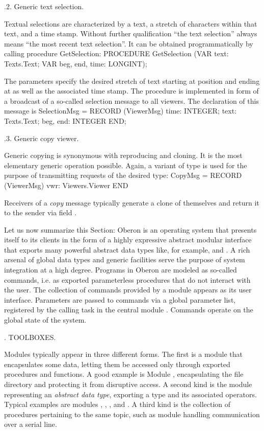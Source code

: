 .2. Generic text selection.

Textual selections are characterized by a text, a stretch of
characters within that text, and a time stamp. Without further
qualification ``the text selection'' always means ``the most recent text selection''.
It can be obtained programmatically by calling procedure GetSelection:
\begintt
PROCEDURE GetSelection (VAR text: Texts.Text;
                        VAR beg, end, time: LONGINT);
\endtt

\noindent The parameters specify the desired stretch of text starting
at position  and ending at  as well as the associated time
stamp. The procedure is implemented in form of a broadcast of a so-called
selection message to all viewers. The declaration of this
message is
\begintt
SelectionMsg = RECORD (ViewerMsg)
  time: INTEGER;
  text: Texts.Text;
  beg, end: INTEGER
END;
\endtt

.3. Generic copy viewer.

Generic copying is synonymous with reproducing and cloning. It is the
most elementary generic operation possible. Again, a variant of type
 is used for the purpose of transmitting requests of the
desired type:
\begintt
CopyMsg = RECORD (ViewerMsg) vwr: Viewers.Viewer END
\endtt 

\noindent Receivers of a \emph{copy} message typically generate a clone of
themselves and return it to the sender via field .

Let us now summarize this Section: Oberon is an operating system that
presents itself to its clients in the form of a highly expressive
abstract modular interface that exports many powerful abstract data
types like, for example,  and . A rich arsenal of global
data types and generic facilities serve the purpose of system
integration at a high degree. Programs in Oberon are modeled as
so-called commands, i.e. as exported parameterless procedures that do
not interact with the user. The collection of commands provided by a
module appears as its user interface. Parameters are passed to
commands via a global parameter list, registered by the calling task
in the central module . Commands operate on the global state of
the system.

. TOOLBOXES.

Modules typically appear in three different forms. The first is a
module that encapsulates some data, letting them be accessed only
through exported procedures and functions. A good example is Module
, encapsulating the file directory and protecting it from
disruptive access. A second kind is the module representing an
\emph{abstract data type}, exporting a type and its associated
operators. Typical examples are modules , , , and
. A third kind is the collection of procedures pertaining to the
same topic, such as module  handling communication over a serial
line.

